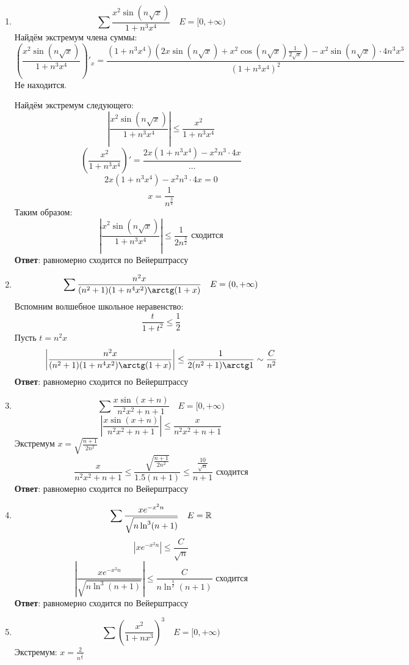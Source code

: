 \begin{exercise}\itemfix
    \begin{enumerate}
        \item \[\sum \frac{x^2 \sin(n \sqrt{x})}{1 + n^3x^4} \quad E = [0, +\infty)\]
              Найдём экстремум члена суммы:
              \[\left(\frac{x^2 \sin(n \sqrt{x})}{1 + n^3x^4}\right)'_x = \frac{(1 + n^3x^4)(2x \sin(n \sqrt{x}) + x^2 \cos (n \sqrt{x}) \frac{1}{2 \sqrt{x}}) - x^2 \sin(n \sqrt{x})\cdot 4n^3x^3}{(1 + n^3x^4)^2} \]
              Не находится.

              Найдём экстремум следующего:
              \[\left|\frac{x^2 \sin(n \sqrt{x})}{1 + n^3x^4}\right| \leq \frac{x^2}{1 + n^3x^4}\]
              \[\left( \frac{x^2}{1 + n^3x^4} \right)' = \frac{2x (1 + n^3x^4) - x^2n^3\cdot 4x}{\dots }\]
              \[2x (1 + n^3x^4) - x^2n^3\cdot 4x = 0\]
              \[x = \frac{1}{n^{\frac{3}{4}}}\]
              Таким образом:
              \[\left|\frac{x^2 \sin(n \sqrt{x})}{1 + n^3x^4}\right| \leq \frac{1}{2n^{\frac{3}{2}}} \text{ сходится}\]
              \textbf{Ответ}: равномерно сходится по Вейерштрассу
        \item \[\sum \frac{n^2x}{(n^2 + 1)(1 + n^4x^2)\arctg(1 + x)} \quad E = (0, +\infty)\]
              Вспомним волшебное школьное неравенство:
              \[\frac{t}{1 + t^2} \leq \frac{1}{2}\]
              Пусть \(t = n^2x\)
              \[\left|\frac{n^2x}{(n^2 + 1)(1 + n^4x^2)\arctg(1 + x)}\right| \leq \frac{1}{2(n^2 + 1)\arctg 1} \sim \frac{C}{n^2}\]
              \textbf{Ответ}: равномерно сходится по Вейерштрассу
        \item \[\sum \frac{x\sin(x + n)}{n^2x^2 + n + 1} \quad E = [0, +\infty)\]
              \[\left|\frac{x\sin(x + n)}{n^2x^2 + n + 1}\right| \leq \frac{x}{n^2x^2 + n + 1}\]
              Экстремум \(x =\sqrt{\frac{n + 1}{2n^2}} \)
              \[\frac{x}{n^2x^2 + n + 1} \leq \frac{\sqrt{\frac{n + 1}{2n^2}}}{1.5(n + 1)} \leq \frac{\frac{10}{\sqrt{n}}}{n + 1} \text{ сходится}  \]
              \textbf{Ответ}: равномерно сходится по Вейерштрассу
        \item \[\sum \frac{xe^{ - x^2n}}{\sqrt{n\ln^3(n + 1)}} \quad E = \mathbb{R}\]
              \[\left|xe^{ - x^2n}\right| \leq \frac{C}{\sqrt{n}}\]
              \[\left|\frac{xe^{ - x^2n}}{\sqrt{n\ln^3(n + 1)}}\right| \leq \frac{C}{n\ln^{\frac{3}{2}}(n + 1)} \text{ сходится}\]
              \textbf{Ответ}: равномерно сходится по Вейерштрассу
        \item \[\sum \left( \frac{x^2}{1 + nx^3} \right)^3 \quad E = [0, +\infty)\]
              Экстремум: \(x = \frac{2}{n^{\frac{1}{3}}}\)


\end{enumerate}
\end{exercise}
